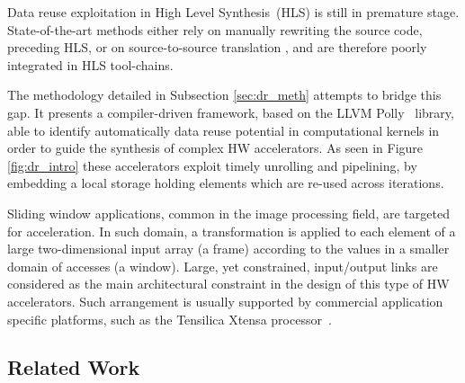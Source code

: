 \documentclass[]{usiinfthesis}
\newcommand{\HLS}{{High Level Synthesis}}
\begin{document}
Data reuse exploitation in \HLS\ (HLS) is still in premature stage.
State-of-the-art methods \cite{Vivado12} either rely on manually rewriting the source code, preceding HLS, 
or on source-to-source translation \cite{PouchetFeb13} \cite{SchmidJul15}, and are therefore 
poorly integrated in HLS tool-chains.\par
    
The methodology detailed in Subsection \ref{sec:dr_meth} attempts to bridge this gap. 
It presents a compiler-driven framework, based on the LLVM Polly~\cite{GrosserApr12} 
library, able to identify automatically data reuse potential in computational kernels in order
to guide the synthesis of complex HW accelerators.
As seen in Figure \ref{fig:dr_intro} these accelerators exploit timely unrolling and 
pipelining, by embedding a local storage holding elements which are re-used across iterations.\par
  
Sliding window applications, common in the image
processing field, are targeted for acceleration. In such domain, a transformation is 
applied to each element of a large two-dimensional input array (a frame) according to the
values in a smaller domain of accesses (a window). Large,
yet constrained, input/output links are considered as the main architectural
constraint in the design of this type of HW accelerators. Such arrangement is
usually supported by commercial application specific platforms, such as the Tensilica
Xtensa processor~\cite{TensilicaWeb}.

\subsection{Related Work}
\end{document}
